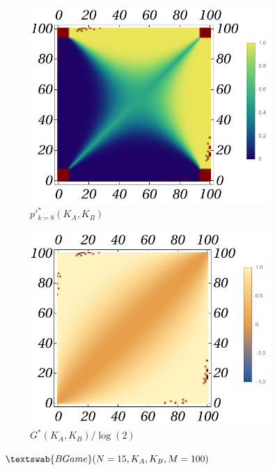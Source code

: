 \documentclass{article}
\theoremstyle{definition}
\newcommand{\BG}[1]{$\textswab{BGame}(#1)$}
\begin{document}
\begin{figure}[H]
\begin{subfigure}[b]{0.24\textwidth}
        \label{fig:BGame15__100_ppk_7}
    \end{subfigure}
    \hfill %
    \begin{subfigure}[b]{0.24\textwidth}
        \includegraphics[width=\textwidth]{img/ppkB_Plot_15_8_100.pdf}
        \caption{$p'^*_{k=8}(K_A,K_B)$}
        \label{fig:BGame15__100_ppk_8}
    \end{subfigure}
    \hfill %
    \begin{subfigure}[b]{0.24\textwidth}
        \includegraphics[width=\textwidth]{img/GB_Plot_15_100.pdf}
        \caption{$G^*(K_A,K_B)/\log(2)$}
        \label{fig:BGame15__100_G}
    \end{subfigure}
    
    \caption[]{\BG{N=15,K_A,K_B,M=100}\footnotemark}
    \label{fig:BGame15__100_PppkG}
\end{figure}
\end{document}
